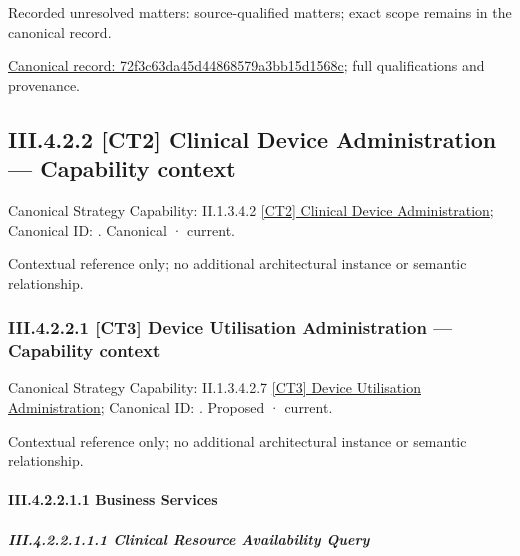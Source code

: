 {\small Recorded unresolved matters: source-qualified matters; exact scope remains in the canonical record.}\par
{\footnotesize \href{../../../../continuum/business/business-process/72f3c63da45d44868579a3bb15d1568c.md}{Canonical record: 72f3c63da45d44868579a3bb15d1568c}; full qualifications and provenance.}\par
\subsection*{III.4.2.2 [CT2] Clinical Device Administration — Capability context}
\label{navigation:III.4.2.2}

{\small Canonical Strategy Capability: II.1.3.4.2 \hyperref[element:31bcd6fda0d14cc8b992cdca39a3cbed]{[CT2] Clinical Device Administration}; Canonical ID: \texttt{}. Canonical · current.}\par
Contextual reference only; no additional architectural instance or semantic relationship.\par
\subsubsection*{III.4.2.2.1 [CT3] Device Utilisation Administration — Capability context}
\label{navigation:III.4.2.2.1}

{\small Canonical Strategy Capability: II.1.3.4.2.7 \hyperref[element:1a3732b5911c45b3aece38b2db2d0f15]{[CT3] Device Utilisation Administration}; Canonical ID: \texttt{}. Proposed · current.}\par
Contextual reference only; no additional architectural instance or semantic relationship.\par
\paragraph*{III.4.2.2.1.1 Business Services}
\label{navigation:III.4.2.2.1.1}

\subparagraph*{III.4.2.2.1.1.1 Clinical Resource Availability Query}
\label{navigation:III.4.2.2.1.1.1}

